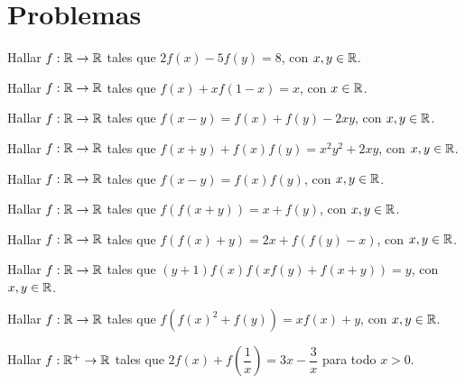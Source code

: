 \section{Problemas}

\begin{exercise}
    Hallar $f : \mathbb{R} \to \mathbb{R}$ tales que $2f(x) - 5f(y) = 8$, con $x, y \in \mathbb{R}$.
\end{exercise}

\begin{exercise}
    Hallar $f : \mathbb{R} \to \mathbb{R}$ tales que $f(x) + xf(1 - x) = x$, con $x \in \mathbb{R}$.
\end{exercise}

\begin{exercise}
    Hallar $f : \mathbb{R} \to \mathbb{R}$ tales que $f(x - y) = f(x) + f(y) - 2xy$, con $x, y \in \mathbb{R}$.
\end{exercise}

\begin{exercise}
    Hallar $f : \mathbb{R} \to \mathbb{R}$ tales que $f(x + y) + f(x)f(y) = x^2 y^2 + 2xy$, con $x, y \in \mathbb{R}$.
\end{exercise}

\begin{exercise}
    Hallar $f : \mathbb{R} \to \mathbb{R}$ tales que $f(x - y) = f(x)f(y)$, con $x, y \in \mathbb{R}$.
\end{exercise}

\begin{exercise}
    Hallar $f : \mathbb{R} \to \mathbb{R}$ tales que $f(f(x + y)) = x + f(y)$, con $x, y \in \mathbb{R}$.
\end{exercise}

\begin{exercise}
    Hallar $f : \mathbb{R} \to \mathbb{R}$ tales que $f(f(x) + y) = 2x + f(f(y) - x)$, con $x, y \in \mathbb{R}$.
\end{exercise}

\begin{exercise}
    Hallar $f : \mathbb{R} \to \mathbb{R}$ tales que $(y + 1)f(x)  f(x f(y) + f(x + y)) = y$, con $x, y \in \mathbb{R}$.
\end{exercise}

\begin{exercise}
    Hallar $f : \mathbb{R} \to \mathbb{R}$ tales que $f\left(f(x)^2 + f(y)\right) = xf(x) + y$, con $x, y \in \mathbb{R}$.
\end{exercise}

\begin{exercise}
    Hallar $f : \mathbb{R}^+ \to \mathbb{R}$ tales que $2f(x) + f\left(\dfrac{1}{x}\right) = 3x - \dfrac{3}{x}$ para todo $x > 0$.
\end{exercise}

